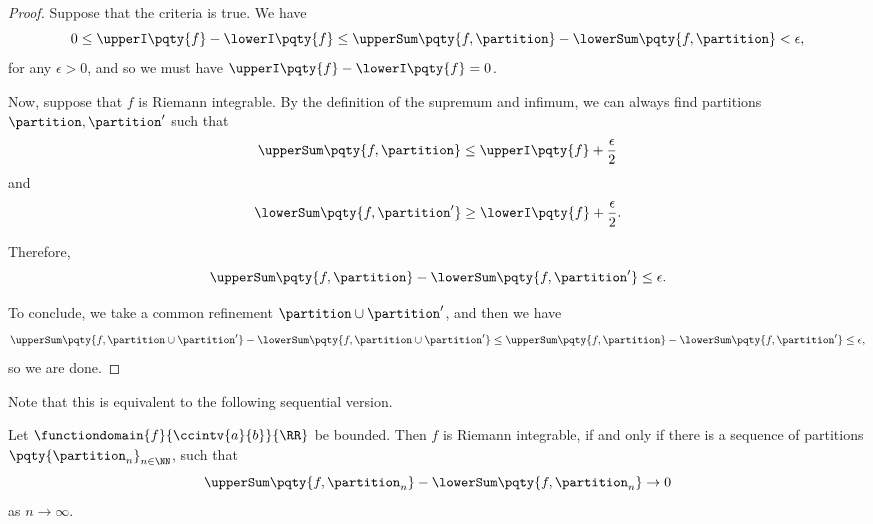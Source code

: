 \begin{proof}
    Suppose that the criteria is true. We have
    \[
        0 \leq \upperI\pqty{f} - \lowerI\pqty{f} \leq \upperSum\pqty{f, \partition} - \lowerSum\pqty{f, \partition} < \epsilon,
    \]
    for any \(\epsilon > 0\), and so we must have \(\upperI\pqty{f} - \lowerI\pqty{f} = 0\).

    Now, suppose that \(f\) is Riemann integrable. By the definition of the supremum and infimum, we can always find partitions \(\partition, \partition'\) such that
    \[
        \upperSum\pqty{f, \partition} \leq \upperI\pqty{f} + \frac{\epsilon}{2}
    \]
    and
    \[
        \lowerSum\pqty{f, \partition'} \geq \lowerI\pqty{f} + \frac{\epsilon}{2}.
    \]

    Therefore,
    \[
        \upperSum\pqty{f, \partition} - \lowerSum\pqty{f, \partition'} \leq \epsilon.
    \]

    To conclude, we take a common refinement \(\partition \cup \partition'\), and then we have
    \[
        \upperSum\pqty{f, \partition \cup \partition'} - \lowerSum\pqty{f, \partition \cup \partition'} \leq \upperSum\pqty{f, \partition} - \lowerSum\pqty{f, \partition'} \leq \epsilon,
    \]
    so we are done.
\end{proof}

Note that this is equivalent to the following sequential version.

\begin{proposition}
    \label{prop:sequential-riemann-integrability-criteria}%
    Let \(\functiondomain{f}{\ccintv{a}{b}}{\RR}\) be bounded. Then \(f\) is Riemann integrable, if and only if there is a sequence of partitions \(\pqty{\partition_n}_{n \in \NN}\), such that
    \[
        \upperSum\pqty{f, \partition_n} - \lowerSum\pqty{f, \partition_n} \to 0
    \]
    as \(n \to \infty\).
\end{proposition}

